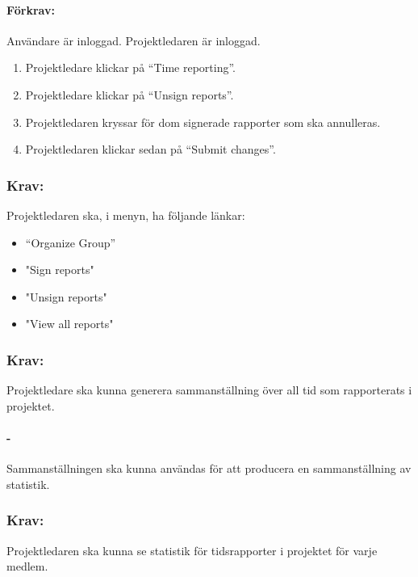 \documentclass[paper=a4, fontsize=11pt,twoside]{article}
\begin{document}
	\paragraph{Förkrav:} Användare är inloggad. Projektledaren är inloggad.
	\begin{enumerate}
		\item Projektledare klickar på “Time reporting”.
		\item Projektledare klickar på “Unsign reports”.
		\item Projektledaren kryssar för dom signerade rapporter som ska annulleras.
		\item Projektledaren klickar sedan på “Submit changes”.
	\end{enumerate}
	
	\paragraph{}
	
	\subsubsection{Krav:}
	Projektledaren ska, i menyn, ha följande länkar:
	\begin{itemize}
		\item “Organize Group”
		\item "Sign reports"
		\item "Unsign reports"
		\item "View all reports"
	\end{itemize}
	
	\paragraph{}
	
	\subsubsection*{Krav:}
	Projektledare ska kunna generera sammanställning över all tid som rapporterats i projektet.
	\paragraph{-}
	Sammanställningen ska kunna användas för att producera en sammanställning av statistik.
	
	\subsubsection*{Krav:}
	Projektledaren ska kunna se statistik för tidsrapporter i projektet för varje medlem.
\end{document}
